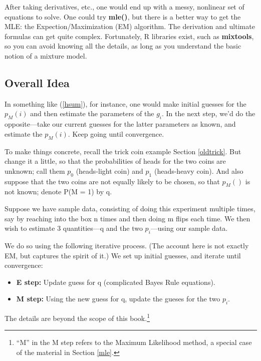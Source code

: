 \documentclass[11pt]{article}
\begin{document}
After taking derivatives, etc., one would end up with a messy, nonlinear
set of equations to solve.  One could try {\bf mle()}, but there is a
better way to get the MLE: the Expection/Maximization (EM) algorithm.
The derivation and ultimate formulas can get quite complex.
Fortunately, R libraries exist, such as {\bf mixtools}, so you can avoid
knowing all the details, as long as you understand the basic notion of a
mixture model.  

\subsection{Overall Idea}

In something like (\ref{hsum}), for instance, one would make initial
guesses for the $p_M(i)$ and then estimate the parameters of the $g_i$.
In the next step, we'd do the opposite---take our current guesses for
the latter parameters as known, and estimate the $p_M(i)$.  Keep going
until convergence.

To make things concrete, recall the trick coin example Section
\ref{oldtrick}.  But change it a little, so that the probabilities of
heads for the two coins are unknown; call them $p_0$ (heads-light coin)
and $p_1$ (heads-heavy coin).  And also suppose that the two coins are
not equally likely to be chosen, so that $p_M()$ is not known; denote
P(M = 1) by q.

Suppose we have sample data, consisting of doing this experiment
multiple times, say by reaching into the box n times and then doing m
flips each time.  We then wish to estimate 3 quantities---q and the two
$p_i$---using our sample data.  

We do so using the following iterative process.  (The account here is
not exactly EM, but captures the spirit of it.) We set up initial
guesses, and iterate until convergence:

\begin{itemize}

\item {\bf E step:} Update guess for q (complicated Bayes Rule equations).

\item {\bf M step:} Using the new guess for q, update the gueses for the
two $p_i$.

\end{itemize}

The details are beyond the scope of this book.\footnote{``M'' in the M
step refers to the Maximum Likelihood method, a special case of the
material in Section \ref{mle}.}
\end{document}
